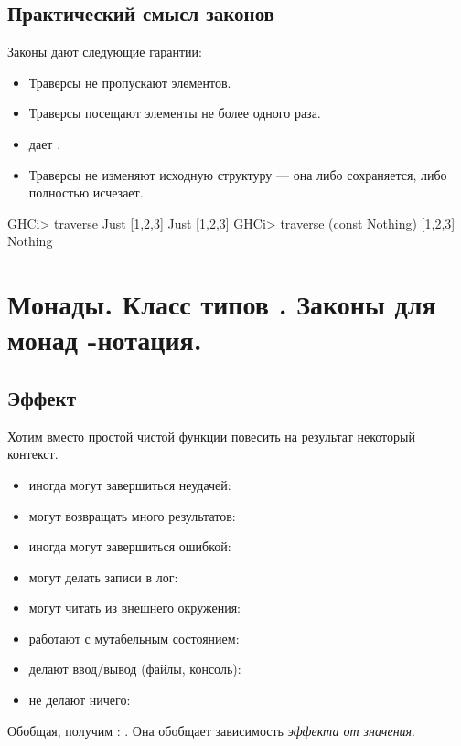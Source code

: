 \documentclass[11pt,a4paper]{article}
\begin{document}
\subsection{Практический смысл законов}
Законы  дают следующие гарантии:
\begin{itemize}
	\item Траверсы не пропускают элементов.
	\item Траверсы посещают элементы не более одного раза. 
	\item {} дает .
	\item Траверсы не изменяют исходную структуру --- она либо сохраняется, либо полностью исчезает.
\end{itemize}
\begin{hscode}
GHCi> traverse Just [1,2,3]
Just [1,2,3]
GHCi> traverse (const Nothing) [1,2,3]
Nothing
\end{hscode}


\section{Монады. Класс типов . Законы для монад -нотация.}
\subsection{Эффект}
Хотим вместо простой чистой функции повесить на результат некоторый контекст.
\begin{itemize}
	\item иногда могут завершиться неудачей: 
	\item могут возвращать много результатов: 
	\item иногда могут завершиться ошибкой: 
	\item могут делать записи в лог: 
	\item могут читать из внешнего окружения: 
	\item работают с мутабельным состоянием: 
	\item делают ввод/вывод (файлы, консоль): 
	\item не делают ничего: 
\end{itemize}
Обобщая, получим : . Она обобщает зависимость \textit{эффекта от значения}.
\end{document}
